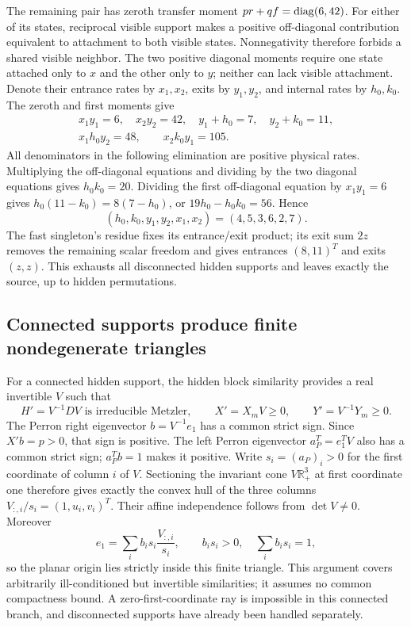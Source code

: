 The remaining pair has zeroth transfer moment
$pr+qf=\operatorname{diag}(6,42)$. For either of its states, reciprocal visible support
makes a positive off-diagonal contribution equivalent to attachment to
both visible states. Nonnegativity therefore forbids a shared visible
neighbor. The two positive diagonal moments require one state attached
only to $x$ and the other only to $y$; neither can lack visible
attachment. Denote their entrance rates by $x_1,x_2$, exits by $y_1,y_2$,
and internal rates by $h_0,k_0$. The zeroth and first moments give
\begin{gather}
 x_1y_1=6,\quad x_2y_2=42,\quad y_1+h_0=7,\quad y_2+k_0=11,\\
 x_1h_0y_2=48,\qquad x_2k_0y_1=105.
\end{gather}
All denominators in the following elimination are positive physical
rates. Multiplying the off-diagonal equations and dividing by the two
diagonal equations gives $h_0k_0=20$. Dividing the first off-diagonal
equation by $x_1y_1=6$ gives
$h_0(11-k_0)=8(7-h_0)$, or $19h_0-h_0k_0=56$. Hence
\begin{equation}
 (h_0,k_0,y_1,y_2,x_1,x_2)=(4,5,3,6,2,7).
\end{equation}
The fast singleton's residue fixes its entrance/exit product; its exit
sum $2z$ removes the remaining scalar freedom and gives entrances
$(8,11)^T$ and exits $(z,z)$. This exhausts all disconnected hidden
supports and leaves exactly the source, up to hidden permutations.

\subsection{Connected supports produce finite nondegenerate triangles}
For a connected hidden support, the hidden block similarity provides a
real invertible $V$ such that
\begin{equation}
 H'=V^{-1}DV\text{ is irreducible Metzler},\qquad
 X'=X_mV\ge0,\qquad Y'=V^{-1}Y_m\ge0.
\end{equation}
The Perron right eigenvector $b=V^{-1}e_1$ has a common strict sign.
Since $X'b=p>0$, that sign is positive. The left Perron eigenvector
$a_P^T=e_1^TV$ also has a common strict sign; $a_P^Tb=1$ makes it
positive. Write $s_i=(a_P)_i>0$ for the first coordinate of column $i$ of
$V$. Sectioning the invariant cone $V\mathbb R_+^3$ at first coordinate
one therefore gives exactly the convex hull of the three columns
$V_{:,i}/s_i=(1,u_i,v_i)^T$. Their affine independence follows from
$\det V\ne0$. Moreover
\begin{equation}
 e_1=\sum_i b_is_i\frac{V_{:,i}}{s_i},\qquad
 b_is_i>0,\quad\sum_i b_is_i=1,
\end{equation}
so the planar origin lies strictly inside this finite triangle. This
argument covers arbitrarily ill-conditioned but invertible similarities;
it assumes no common compactness bound. A zero-first-coordinate ray is
impossible in this connected branch, and disconnected supports have
already been handled separately.

